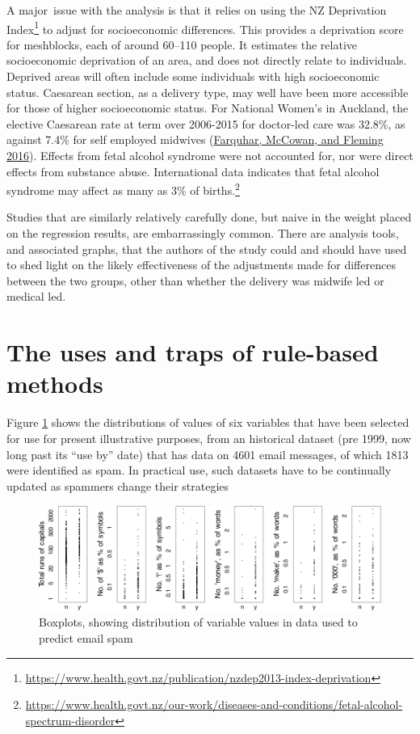 \documentclass[
  10pt,
  b5paper]{book}
\begin{document}
A major~issue with the analysis is that it relies on using the NZ
Deprivation Index\footnote{
  \url{https://www.health.govt.nz/publication/nzdep2013-index-deprivation}}
to adjust for socioeconomic differences. This provides a deprivation
score for meshblocks, each of around 60--110 people. It estimates the
relative socioeconomic deprivation of an area, and does not directly
relate to individuals. Deprived areas will often include some
individuals with high socioeconomic status. Caesarean section, as a
delivery type, may well have been more accessible for those of
higher socioeconomic status. For National Women's in Auckland,
the elective Caesarean rate at term over 2006-2015 for doctor-led
care was 32.8\%, as against 7.4\% for self employed midwives
(\protect\hyperlink{ref-farquhar2016letter}{Farquhar, McCowan, and Fleming 2016}). Effects from fetal alcohol syndrome were
not accounted for, nor were direct effects from substance abuse.
International data indicates that fetal alcohol syndrome may
affect as many as 3\% of
births.\footnote{\url{https://www.health.govt.nz/our-work/diseases-and-conditions/fetal-alcohol-spectrum-disorder}}

Studies that are similarly relatively carefully done,
but naive in the weight placed on the regression results,
are embarrassingly common. There are analysis tools, and
associated graphs, that the authors of the study could
and should have used to shed light on the likely
effectiveness of the adjustments made for differences
between the two groups, other than whether the delivery
was midwife led or medical led.

\hypertarget{the-uses-and-traps-of-rule-based-methods}{%
\section{The uses and traps of rule-based methods}\label{the-uses-and-traps-of-rule-based-methods}}

Figure \ref{fig:seeSpam} shows the distributions of values of
six variables that have been selected for use for present
illustrative purposes, from an historical dataset (pre 1999, now
long past its ``use by'' date) that has data on 4601 email
messages, of which 1813 were identified as spam. In practical
use, such datasets have to be continually updated as spammers
change their strategies

\begin{figure}[H]

{\centering \includegraphics{08-observational_files/figure-latex/seeSpam-1} 

}

\caption{Boxplots, showing distribution of variable values
               in data used to predict email spam}\label{fig:seeSpam}
\end{figure}
\end{document}
